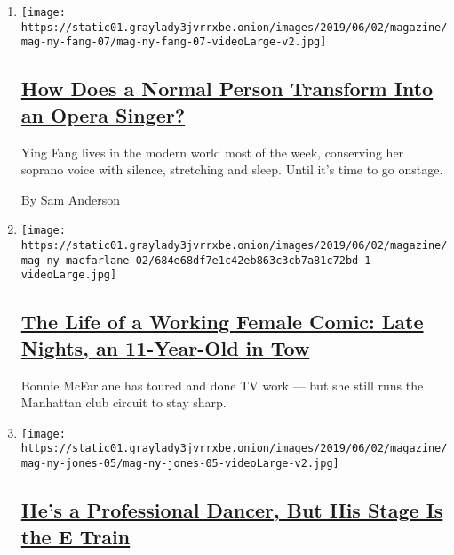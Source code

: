 \begin{enumerate}
\def\labelenumi{\arabic{enumi}.}
\item
  \texttt{[image: https://static01.graylady3jvrrxbe.onion/images/2019/06/02/magazine/mag-ny-fang-07/mag-ny-fang-07-videoLarge-v2.jpg]}

  \hypertarget{how-does-a-normal-person-transform-into-an-opera-singer}{%
  \subsection{\texorpdfstring{\href{/interactive/2019/05/30/magazine/metropolitan-opera-singer-new-york.html}{How
  Does a Normal Person Transform Into an Opera
  Singer?}}{How Does a Normal Person Transform Into an Opera Singer?}}\label{how-does-a-normal-person-transform-into-an-opera-singer}}

  Ying Fang lives in the modern world most of the week, conserving her
  soprano voice with silence, stretching and sleep. Until it's time to
  go onstage.

  By Sam Anderson
\item
  \texttt{[image: https://static01.graylady3jvrrxbe.onion/images/2019/06/02/magazine/mag-ny-macfarlane-02/684e68df7e1c42eb863c3cb7a81c72bd-1-videoLarge.jpg]}

  \hypertarget{the-life-of-a-working-female-comic-late-nights-an-11-year-old-in-tow}{%
  \subsection{\texorpdfstring{\href{/interactive/2019/05/30/magazine/female-comedy-new-york.html}{The
  Life of a Working Female Comic: Late Nights, an 11-Year-Old in
  Tow}}{The Life of a Working Female Comic: Late Nights, an 11-Year-Old in Tow}}\label{the-life-of-a-working-female-comic-late-nights-an-11-year-old-in-tow}}

  Bonnie McFarlane has toured and done TV work --- but she still runs
  the Manhattan club circuit to stay sharp.
\item
  \texttt{[image: https://static01.graylady3jvrrxbe.onion/images/2019/06/02/magazine/mag-ny-jones-05/mag-ny-jones-05-videoLarge-v2.jpg]}

  \hypertarget{hes-a-professional-dancer-but-his-stage-is-the-e-train}{%
  \subsection{\texorpdfstring{\href{/interactive/2019/05/30/magazine/subway-dance-new-york.html}{He's
  a Professional Dancer, But His Stage Is the E
  Train}}{He's a Professional Dancer, But His Stage Is the E Train}}\label{hes-a-professional-dancer-but-his-stage-is-the-e-train}}


\end{enumerate}
